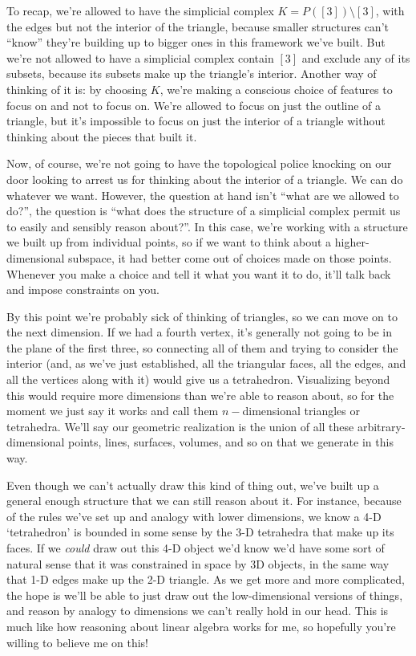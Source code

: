 \documentclass{lec}
\begin{document}
    To recap, we're allowed to have the simplicial complex $K = P([3]) \setminus [3]$, with the edges but not the interior of the triangle, because smaller structures can't ``know'' they're building up to bigger ones in this framework we've built. But we're not allowed to have a simplicial complex contain $[3]$ and exclude any of its subsets, because its subsets make up the triangle's interior. Another way of thinking of it is: by choosing $K$, we're making a conscious choice of features to focus on and not to focus on. We're allowed to focus on just the outline of a triangle, but it's impossible to focus on just the interior of a triangle without thinking about the pieces that built it.

    Now, of course, we're not going to have the topological police knocking on our door looking to arrest us for thinking about the interior of a triangle. We can do whatever we want. However, the question at hand isn't ``what are we allowed to do?'', the question is ``what does the structure of a simplicial complex permit us to easily and sensibly reason about?''. In this case, we're working with a structure we built up from individual points, so if we want to think about a higher-dimensional subspace, it had better come out of choices made on those points. Whenever you make a choice and tell it what you want it to do, it'll talk back and impose constraints on you.

    By this point we're probably sick of thinking of triangles, so we can move on to the next dimension. If we had a fourth vertex, it's {\color{red} generally} not going to be in the plane of the first three, so connecting all of them and trying to consider the interior (and, as we've just established, all the triangular faces, all the edges, and all the vertices along with it) would give us a tetrahedron. Visualizing beyond this would require more dimensions than we're able to reason about, so for the moment we just say it works and call them $n-$dimensional triangles or tetrahedra. We'll say our geometric realization is the union of all these arbitrary-dimensional points, lines, surfaces, volumes, and so on that we generate in this way.
    
    Even though we can't actually draw this kind of thing out, we've built up a general enough structure that we can still reason about it. For instance, because of the rules we've set up and analogy with lower dimensions, we know a 4-D `tetrahedron' is bounded in some sense by the 3-D tetrahedra that make up its faces. If we \textit{could} draw out this 4-D object we'd know we'd have some sort of natural sense that it was constrained in space by 3D objects, in the same way that 1-D edges make up the 2-D triangle. As we get more and more complicated, the hope is we'll be able to just draw out the low-dimensional versions of things, and reason by analogy to dimensions we can't really hold in our head. This is much like how reasoning about linear algebra works for me, so hopefully you're willing to believe me on this! 
\end{document}

